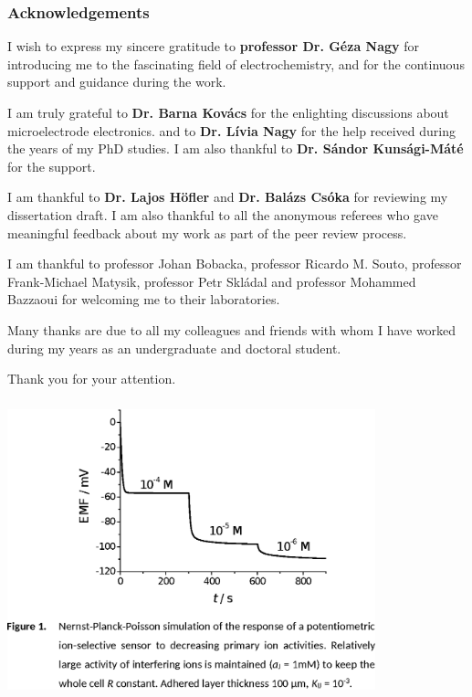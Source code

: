 \documentclass{beamer}
\begin{document}
\begin{frame}
\frametitle{Acknowledgements}
\scriptsize
I wish to express my sincere gratitude to \textbf{professor Dr. Géza Nagy} for introducing me to the fascinating field of electrochemistry, and for the continuous support and guidance during the work.

\vspace{4mm}

I am truly grateful to \textbf{Dr. Barna Kovács} for the enlighting discussions about microelectrode electronics. and to \textbf{Dr. Lívia Nagy} for the help received during the years of my PhD studies. I am also thankful to \textbf{Dr. Sándor Kunsági-Máté} for the support.

\vspace{4mm}

I am thankful to \textbf{Dr. Lajos Höfler} and \textbf{Dr. Balázs Csóka} for reviewing my dissertation draft. I am also thankful to all the anonymous referees who gave meaningful feedback about my work as part of the peer review process.

\vspace{4mm}

I am thankful to professor Johan Bobacka, professor Ricardo M. Souto, professor Frank-Michael Matysik, professor Petr Skládal and professor Mohammed Bazzaoui for welcoming me to their laboratories.

\vspace{4mm}

Many thanks are due to all my colleagues and friends with whom I have worked during my years as an undergraduate and doctoral student.

\end{frame}

\begin{frame}
\centering
Thank you for your attention.
\end{frame}


\begin{frame}
	\frametitle{}
	\centering
\includegraphics[width=0.8\textwidth]{HL1.eps}
\end{frame}
\end{document}
